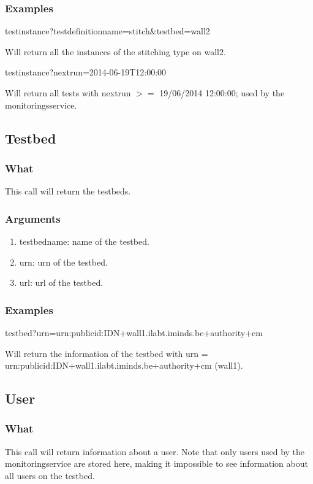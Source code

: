 \begin{otherlanguage}{english}
\subsubsection{Examples}
\begin{lt}
testinstance?testdefinitionname=stitch&testbed=wall2
\end{lt}
Will return all the instances of the stitching type on wall2.
\begin{lt}
testinstance?nextrun=2014-06-19T12:00:00
\end{lt}
Will return all tests with nextrun $>=$ 19/06/2014 12:00:00; used by the monitoringsservice.\\

\subsection{Testbed}
\subsubsection{What}
This call will return the testbeds.
\subsubsection{Arguments}
\begin{enumerate}
\item testbedname: name of the testbed.
\item urn: urn of the testbed.
\item url: url of the testbed.
\end{enumerate}
\subsubsection{Examples}
\begin{lt}
testbed?urn=urn:publicid:IDN+wall1.ilabt.iminds.be+authority+cm
\end{lt}
Will return the information of the testbed with urn = \\
urn:publicid:IDN+wall1.ilabt.iminds.be+authority+cm (wall1).
\\
\subsection{User}
\subsubsection{What}
This call will return information about a user. Note that only users used by the monitoringservice are stored here, making it impossible to see information about all users on the testbed.

\end{otherlanguage}
